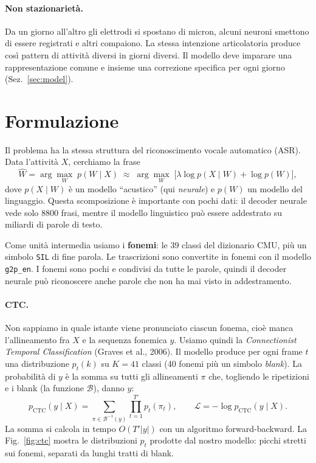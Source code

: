 \documentclass[10pt,a4paper]{article}
\begin{document}
\paragraph{Non stazionarietà.} Da un giorno all'altro gli elettrodi si spostano di micron, alcuni neuroni smettono di essere registrati e altri compaiono. La stessa intenzione articolatoria produce così pattern di attività diversi in giorni diversi. Il modello deve imparare una rappresentazione comune e insieme una correzione specifica per ogni giorno (Sez.~\ref{sec:model}).

\section{Formulazione}

Il problema ha la stessa struttura del riconoscimento vocale automatico (ASR). Data l'attività $X$, cerchiamo la frase
\begin{equation}
\hat W = \arg\max_W \; p(W\mid X) \;\approx\; \arg\max_W \; \big[\lambda \log p(X\mid W) + \log p(W)\big],
\label{eq:bayes}
\end{equation}
dove $p(X\mid W)$ è un modello ``acustico'' (qui \emph{neurale}) e $p(W)$ un modello del linguaggio. Questa scomposizione è importante con pochi dati: il decoder neurale vede solo 8800 frasi, mentre il modello linguistico può essere addestrato su miliardi di parole di testo.

Come unità intermedia usiamo i \textbf{fonemi}: le 39 classi del dizionario CMU, più un simbolo \texttt{SIL} di fine parola. Le trascrizioni sono convertite in fonemi con il modello \texttt{g2p\_en}. I fonemi sono pochi e condivisi da tutte le parole, quindi il decoder neurale può riconoscere anche parole che non ha mai visto in addestramento.

\paragraph{CTC.} Non sappiamo in quale istante viene pronunciato ciascun fonema, cioè manca l'allineamento fra $X$ e la sequenza fonemica $y$. Usiamo quindi la \emph{Connectionist Temporal Classification} (Graves et al., 2006). Il modello produce per ogni frame $t$ una distribuzione $p_t(k)$ su $K=41$ classi (40 fonemi più un simbolo \emph{blank}). La probabilità di $y$ è la somma su tutti gli allineamenti $\pi$ che, togliendo le ripetizioni e i blank (la funzione $\mathcal{B}$), danno $y$:
\begin{equation}
p_{\text{CTC}}(y\mid X) = \sum_{\pi\in\mathcal{B}^{-1}(y)} \prod_{t=1}^{T'} p_t(\pi_t),
\qquad \mathcal{L} = -\log p_{\text{CTC}}(y\mid X).
\end{equation}
La somma si calcola in tempo $O(T'|y|)$ con un algoritmo forward-backward. La Fig.~\ref{fig:ctc} mostra le distribuzioni $p_t$ prodotte dal nostro modello: picchi stretti sui fonemi, separati da lunghi tratti di blank.
\end{document}
